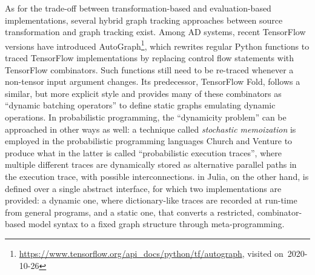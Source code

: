 As for the trade-off between transformation-based and evaluation-based implementations, several
hybrid graph tracking approaches between source transformation and graph tracking exist.  Among AD
systems, recent TensorFlow versions have introduced
AutoGraph\footnote{\url{https://www.tensorflow.org/api_docs/python/tf/autograph}, visited
  on~2020-10-26}, which rewrites regular Python functions to traced TensorFlow implementations by
replacing control flow statements with TensorFlow combinators.  Such functions still need to be
re-traced whenever a non-tensor input argument changes.  Its predecessor, TensorFlow Fold,
\parencite{looks2017deep} follows a similar, but more explicit style and provides many of these
combinators as \enquote{dynamic batching operators} to define static graphs emulating dynamic
operations.  In probabilistic programming, the \enquote{dynamicity problem} can be approached in
other ways as well: a technique called \emph{stochastic memoization} is employed in the
probabilistic programming languages Church \parencite{goodman2012church} and Venture
\parencite{mansinghka2014venture} to produce what in the latter is called \enquote{probabilistic
  execution traces}, where multiple different traces are dynamically stored as alternative parallel
paths in the execution trace, with possible interconnections.  
\parencite{cusumano-towner2019gen,cusumano-towner2020gen} in Julia, on the other hand, is defined
over a single abstract interface, for which two implementations are provided: a dynamic one, where
dictionary-like traces are recorded at run-time from general programs, and a static one, that
converts a restricted, combinator-based model syntax to a fixed graph structure through
meta-programming.


